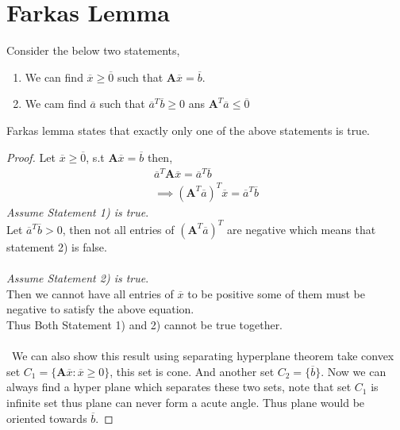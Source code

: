 \documentclass{tufte-handout}
\theoremstyle{remark}
\begin{document}
\section{Farkas Lemma}
Consider the below two statements,\\
\begin{enumerate}
    \item We can find $\overline{x} \ge \overline{0}$ such that $\mathbf{A}\overline{x} = \overline{b}$.
    \item We cam find $\overline{a}$ such that $\overline{a}^T\overline{b} \ge 0$ ans $\mathbf{A}^T\overline{a} \le \overline{0}$
\end{enumerate}
Farkas lemma states that exactly only one of the above statements is true.
\begin{proof}
    Let $\overline{x} \ge \overline{0}$, s.t $\mathbf{A}\overline{x} = \overline{b}$ then,
    \begin{gather*}
        \overline{a}^T\mathbf{A}\overline{x} = \overline{a}^T\overline{b}\\
        \implies (\mathbf{A}^T\overline{a})^T\overline{x} = \overline{a}^T\overline{b}
    \end{gather*}
    \textit{Assume Statement 1) is true}.\\
    Let $\overline{a}^T\overline{b} > 0$, then not all entries of $(\mathbf{A}^T\overline{a})^T$ are negative which means that statement 2) is false.\\ \ \\
    \textit{Assume Statement 2) is true}.\\
    Then we cannot have all entries of $\overline{x}$ to be positive some of them must be negative to satisfy the above equation.\\
    Thus Both Statement 1) and 2) cannot be true together.\\ \\\
    We can also show this result using separating hyperplane theorem take convex set $C_1 = \{\mathbf{A}\overline{x}: \overline{x} \ge 0\}$, this set is cone. And another set $C_2 = \{\overline{b}\}$. Now we can always find a hyper plane which separates these two sets, note that set $C_1$ is infinite set thus plane can never form a acute angle. Thus plane would be oriented towards $\overline{b}$. 
\end{proof}
\end{document}
